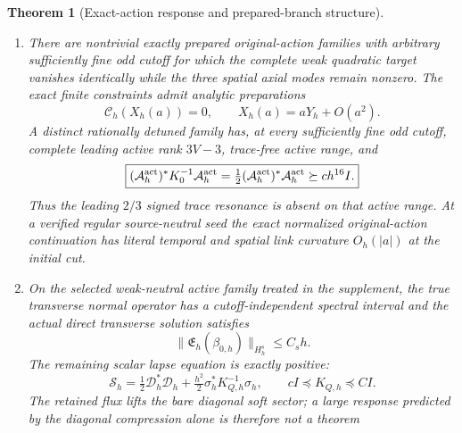 \documentclass[11pt]{article}
\newtheorem{theorem}{Theorem}[section]
\theoremstyle{definition}
\theoremstyle{remark}
\begin{document}
\begin{theorem}[Exact-action response and prepared-branch structure]
\begin{enumerate}[label=\textup{(X\arabic*)},leftmargin=3em]
      conditions $w_h\to0$ and $H_h^{-1}E^*w_h\to0$.  Diagonalizing $C$
      recovers the unique trace-angle resonance $\mu=2/3$ as a corollary,
      rather than as a separate physical postulate.
\item There are nontrivial exactly prepared original-action families with
      arbitrary sufficiently fine odd cutoff for which the complete weak
      quadratic target vanishes identically while the three spatial axial
      modes remain nonzero.  The exact finite constraints admit analytic
      preparations
      \begin{equation}
       \boxed{\mathscr C_h(X_h(a))=0,\qquad
       X_h(a)=aY_h+O(a^2).}
       \label{eq:main-exact-action-neutral-preparation}
      \end{equation}
      A distinct rationally detuned family has, at every sufficiently fine
      odd cutoff, complete leading active rank $3V-3$, trace-free active
      range, and
      \begin{equation}
       \boxed{(\mathcal A_h^{\rm act})^*K_0^{-1}\mathcal A_h^{\rm act}
       =\tfrac12(\mathcal A_h^{\rm act})^*\mathcal A_h^{\rm act}
       \succeq c h^{16}I.}
       \label{eq:main-exact-action-active-gram}
      \end{equation}
      Thus the leading $2/3$ signed trace resonance is absent on that active
      range.  At a verified regular source-neutral seed the exact normalized
      original-action continuation has literal temporal and spatial link
      curvature $O_h(|a|)$ at the initial cut.
\item On the selected weak-neutral active family treated in the supplement,
      the true transverse normal operator has a cutoff-independent spectral
      interval and the actual direct transverse solution satisfies
      \begin{equation}
       \boxed{\|\mathfrak E_h(\beta_{0,h})\|_{H_h^s}\le C_sh.}
       \label{eq:main-exact-action-direct-output}
      \end{equation}
      The remaining scalar lapse equation is exactly positive:
      \begin{equation}
       \boxed{\mathscr S_h
       =\tfrac12\mathscr D_h^*\mathscr D_h
        +\tfrac{h^2}{2}\sigma_h^*K_{Q,h}^{-1}\sigma_h,
       \qquad cI\preceq K_{Q,h}\preceq CI.}
       \label{eq:main-exact-action-scalar-flux}
      \end{equation}
      The retained flux lifts the bare diagonal soft sector; a large response
      predicted by the diagonal compression alone is therefore not a theorem

\end{enumerate}
\end{theorem}
\end{document}
